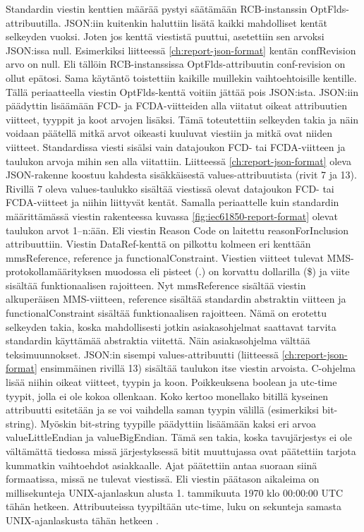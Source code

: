 Standardin viestin kenttien määrää pystyi säätämään RCB-instanssin OptFlds-attribuutilla. JSON:iin kuitenkin haluttiin lisätä kaikki mahdolliset kentät selkeyden vuoksi. Joten jos kenttä viestistä puuttui, asetettiin sen arvoksi JSON:issa null. Esimerkiksi liitteessä \ref{ch:report-json-format} kentän confRevision arvo on null. Eli tällöin RCB-instanssissa OptFlds-attribuutin conf-revision on ollut epätosi. Sama käytäntö toistettiin kaikille muillekin vaihtoehtoisille kentille. Tällä periaatteella viestin OptFlds-kenttä voitiin jättää pois JSON:ista. JSON:iin päädyttin lisäämään FCD- ja FCDA-viitteiden alla viitatut oikeat attribuutien viitteet, tyyppit ja koot arvojen lisäksi. Tämä toteutettiin selkeyden takia ja näin voidaan päätellä mitkä arvot oikeasti kuuluvat viestiin ja mitkä ovat niiden viitteet. Standardissa viesti sisälsi vain datajoukon FCD- tai FCDA-viitteen ja taulukon arvoja mihin sen alla viitattiin. Liitteessä \ref{ch:report-json-format} oleva JSON-rakenne koostuu kahdesta sisäkkäisestä values-attribuutista (rivit 7 ja 13). Rivillä 7 oleva values-taulukko sisältää viestissä olevat datajoukon FCD- tai FCDA-viitteet ja niihin liittyvät kentät. Samalla periaattelle kuin standardin määrittämässä viestin rakenteessa kuvassa \ref{fig:iec61850-report-format} olevat taulukon arvot 1--n:ään. Eli viestin Reason Code on laitettu reasonForInclusion attribuuttiin. Viestin DataRef-kenttä on pilkottu kolmeen eri kenttään mmsReference, reference ja functionalConstraint. Viestien viitteet tulevat MMS-protokollamäärityksen muodossa eli pisteet (.) on korvattu dollarilla (\$) ja viite sisältää funktionaalisen rajoitteen. Nyt mmsReference sisältää viestin alkuperäisen MMS-viitteen, reference sisältää standardin abstraktin viitteen ja functionalConstraint sisältää funktionaalisen rajoitteen. Nämä on erotettu selkeyden takia, koska mahdollisesti jotkin asiakasohjelmat saattavat tarvita standardin käyttämää abstraktia viitettä. Näin asiakasohjelma välttää teksimuunnokset. JSON:in sisempi values-attribuutti (liitteessä \ref{ch:report-json-format} ensimmäinen rivillä 13) sisältää taulukon itse viestin arvoista. C-ohjelma lisää niihin oikeat viitteet, tyypin ja koon. Poikkeuksena boolean ja utc-time tyypit, jolla ei ole kokoa ollenkaan. Koko kertoo monellako bitillä kyseinen attribuutti esitetään ja se voi vaihdella saman tyypin välillä (esimerkiksi bit-string). Myöskin bit-string tyypille päädyttiin lisäämään kaksi eri arvoa valueLittleEndian ja valueBigEndian. Tämä sen takia, koska tavujärjestys ei ole vältämättä tiedossa missä järjestyksessä bitit muuttujassa ovat päätettiin tarjota kummatkin vaihtoehdot asiakkaalle. Ajat päätettiin antaa suoraan siinä formaatissa, missä ne tulevat viestissä. Eli viestin päätason aikaleima on millisekunteja UNIX-ajanlaskun alusta 1. tammikuuta 1970 klo 00:00:00 UTC tähän hetkeen. Attribuuteissa tyypiltään utc-time, luku on sekunteja samasta UNIX-ajanlaskusta tähän hetkeen \cite[s.~26--27]{IEC61850-7-2}.